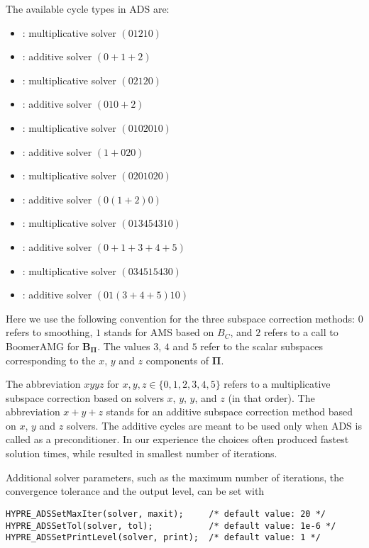 \noindent
The available cycle types in ADS are:
\begin{itemize}
\item {}: multiplicative solver $(01210)$
\item {}: additive solver $(0+1+2)$
\item {}: multiplicative solver $(02120)$
\item {}: additive solver $(010+2)$
\item {}: multiplicative solver $(0102010)$
\item {}: additive solver $(1+020)$
\item {}: multiplicative solver $(0201020)$
\item {}: additive solver $(0(1+2)0)$
\item {}: multiplicative solver $(013454310)$
\item {}: additive solver $(0+1+3+4+5)$
\item {}: multiplicative solver $(034515430)$
\item {}: additive solver $(01(3+4+5)10)$
\end{itemize}
Here we use the following convention for the three subspace correction methods:
$0$ refers to smoothing, $1$ stands for AMS based on $B_C$, and $2$ refers to a
call to BoomerAMG for ${\mathbf B}_{{\mathbf \Pi}}$.  The values $3$, $4$ and
$5$ refer to the scalar subspaces corresponding to the $x$, $y$ and $z$
components of $\mathbf \Pi$.

The abbreviation $xyyz$ for $x,y,z \in \{0,1,2,3,4,5\}$ refers to a
multiplicative subspace correction based on solvers $x$, $y$, $y$, and $z$ (in
that order).  The abbreviation $x+y+z$ stands for an additive subspace
correction method based on $x$, $y$ and $z$ solvers.  The additive cycles are
meant to be used only when ADS is called as a preconditioner.  In our experience
the choices  often produced fastest solution times,
while  resulted in smallest number of iterations.

Additional solver parameters, such as the maximum number of iterations, the
convergence tolerance and the output level, can be set with
\begin{display}\begin{verbatim}
HYPRE_ADSSetMaxIter(solver, maxit);     /* default value: 20 */
HYPRE_ADSSetTol(solver, tol);           /* default value: 1e-6 */
HYPRE_ADSSetPrintLevel(solver, print);  /* default value: 1 */
\end{verbatim}\end{display}

